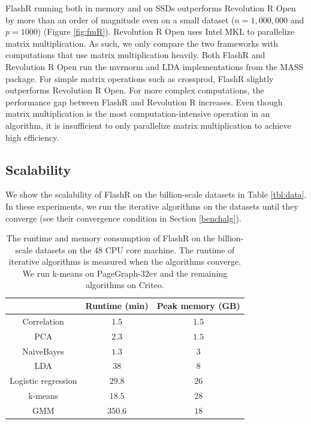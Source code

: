 FlashR running both in memory and on SSDs outperforms Revolution R Open by more
than an order of magnitude even on a small dataset ($n=1,000,000$ and $p=1000$)
(Figure \ref{fig:fmR}).
Revolution R Open uses Intel MKL to parallelize matrix multiplication. As such,
we only compare the two frameworks with computations that use matrix
multiplication heavily. Both FlashR and Revolution R Open run the mvrnorm
and LDA implementations from the MASS package. For simple matrix operations
such as crossprod, FlashR slightly outperforms Revolution R Open.
For more complex computations, the performance gap between FlashR and
Revolution R increases. Even though matrix multiplication
is the most computation-intensive operation in an algorithm, it is insufficient
to only parallelize matrix multiplication to achieve high efficiency.

\subsection{Scalability}

We show the scalability of FlashR on the billion-scale datasets in Table
\ref{tbl:data}. In these experiments, we run the iterative algorithms on
the datasets until they converge (see their convergence condition in Section
\ref{benchalg}).

\begin{table}
\begin{center}
	\caption{The runtime and memory consumption of FlashR on the billion-scale
		datasets on the 48 CPU core machine. The runtime of iterative
		algorithms is measured when the algorithms converge. We run k-means
		on PageGraph-32ev and the remaining algorithms on Criteo.}
\vspace{-10pt}
\footnotesize
\begin{tabular}{|c|c|c|}
\hline
	& Runtime (min) & Peak memory (GB) \\
\hline
Correlation & $1.5$ & $1.5$ \\
\hline
PCA & $2.3$ & $1.5$ \\
\hline
NaiveBayes & $1.3$ & $3$ \\
\hline
LDA & $38$ & $8$ \\
\hline
Logistic regression & $29.8$ & $26$ \\
\hline
k-means & $18.5$ & $28$ \\
\hline
GMM & $350.6$ & $18$ \\
\hline
\end{tabular}
\normalsize
\label{tbl:scale}
\end{center}
\vspace{-10pt}
\end{table}

